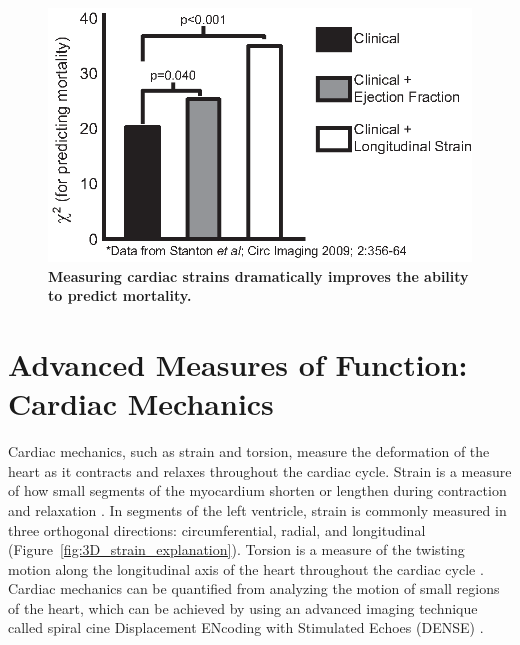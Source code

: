 	\begin{figure}
		\centering
		\includegraphics{figures/intro/stanton}
		\caption[Measuring cardiac strains dramatically improves the ability to predict mortality]{\textbf{Measuring cardiac strains dramatically improves the ability to predict mortality.}}
		\label{fig:stanton}
	\end{figure}

\section{Advanced Measures of Function: Cardiac Mechanics}
 	Cardiac mechanics, such as strain and torsion, measure the deformation of the heart as it contracts and relaxes throughout the cardiac cycle. Strain is a measure of how small segments of the myocardium shorten or lengthen during contraction and relaxation \cite{Gotte2006a,Amundsen2006}. In segments of the left ventricle, strain is commonly measured in three orthogonal directions: circumferential, radial, and longitudinal (Figure~\ref{fig:3D_strain_explanation}). Torsion is a measure of the twisting motion along the longitudinal axis of the heart throughout the cardiac cycle \cite{Kowallick2014,Kowallick2016}. Cardiac mechanics can be quantified from analyzing the motion of small regions of the heart, which can be achieved by using an advanced imaging technique called spiral cine Displacement ENcoding with Stimulated Echoes (DENSE) \cite{Aletras1999b}.
 	
